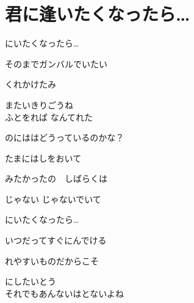 \section{ 君に逢いたくなったら…}

\large{

にいたくなったら…

そのまでガンバルでいたい

くれかけたみ

またいきりごうね
\\

ふとをれば なんてれた

のにははどうっているのかな？

たまにはしをおいて

みたかったの　しばらくは

じゃない じゃないでいて
\\


にいたくなったら…

いつだってすぐにんでける

れやすいものだからこそ

にしたいとう
\\

それでもあんないはとないよね

}
